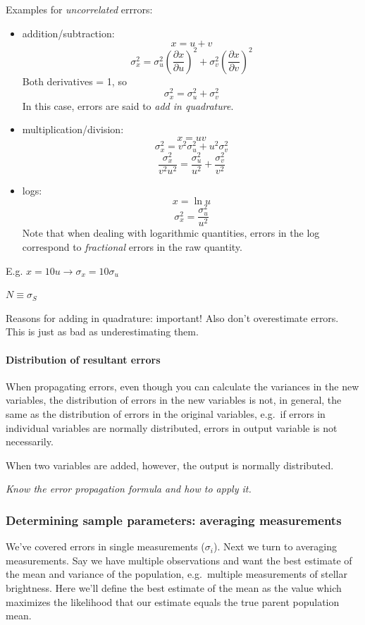 \documentclass[12pt]{article}
\newcommand{\mynotes}[1]{\textcolor{myBlue}{#1}}
\newcommand{\test}[1]{%
    \begin{center}
        {\parbox{0.9\textwidth}{\textit{\small#1}}}
    \end{center}}
\begin{document}
Examples for \emph{uncorrelated} errrors:
\begin{itemize}
    \item addition/subtraction:
        $$ x = u + v $$
        $$ \sigma_x^{2} = \sigma_u^{2}\left(\frac{\partial x}
        {\partial u}\right)^{2}
        + \sigma_v^{2}\left(\frac{\partial x}{\partial v}\right)^{2} $$
        Both derivatives = 1, so
        $$ \sigma_x^{2} = \sigma_u^{2} + \sigma_v^{2} $$
        In this case, errors are said to \emph{add in quadrature}.
    \item multiplication/division:
        $$ x = uv $$
        $$ \sigma_x^{2} = v^{2}\sigma_u^{2} + u^{2}\sigma_v^{2} $$
        $$ \frac{\sigma_x^{2}}{v^{2}u^{2}} =
        \frac{\sigma_u^{2}}{u^{2}} + \frac{\sigma_v^{2}}{v^{2}}$$
    \item logs:
        $$ x = \ln u $$
        $$ \sigma_x^{2} = \frac{\sigma_u^{2}}{u^{2}} $$
        Note that when dealing with logarithmic quantities, errors in
        the log correspond to \emph{fractional} errors in the raw
        quantity.
\end{itemize}

\textcolor{myBlue}{E.g. $x=10u \rightarrow \sigma_x=10\sigma_u$}

\textcolor{myBlue}{$N \equiv \sigma_S$}

\mynotes{Reasons for adding in quadrature: important! Also don't overestimate
errors. This is just as bad as underestimating them.}

\paragraph{Distribution of resultant errors}
When propagating errors, even though you can calculate the variances
in the new variables, the distribution of errors in the new variables
is not, in general, the same as the distribution of errors in the
original variables, e.g.\ if errors in individual variables are
normally distributed, errors in output variable is not necessarily.

When two variables are added, however, the output is normally
distributed.

\test{Know the error propagation formula and how to apply it.}

\subsubsection{Determining sample parameters: averaging measurements}
We've covered errors in single measurements ($\sigma_{i}$). Next we turn to
averaging measurements. Say we have multiple observations and want the best
estimate of the mean and variance of the population, e.g.\ multiple
measurements of stellar brightness. Here we'll define the best estimate of the
mean as the value which maximizes the likelihood that our estimate equals the
true parent population mean.
\end{document}
